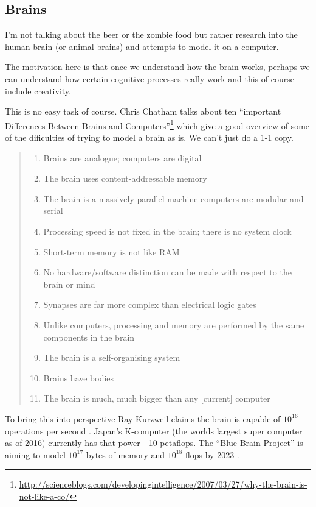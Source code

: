 \subsection{Brains}

I'm not talking about the beer or the zombie food but rather research into the human brain (or animal brains) and attempts to model it on a computer. 

The motivation here is that once we understand how the brain works, perhaps we can understand how certain cognitive processes really work and this of course include creativity.

This is no easy task of course. Chris Chatham talks about ten ``important Differences Between Brains and Computers''\footnote{\url{http://scienceblogs.com/developingintelligence/2007/03/27/why-the-brain-is-not-like-a-co/}} which give a good overview of some of the dificulties of trying to model a brain as is. We can't just do a 1-1 copy.

\begin{quotation}
  \begin{enumerate}
    \item Brains are analogue; computers are digital
    \item The brain uses content-addressable memory
    \item The brain is a massively parallel machine computers are modular and serial
    \item Processing speed is not fixed in the brain; there is no system clock
    \item Short-term memory is not like RAM
    \item No hardware/software distinction can be made with respect to the brain or mind
    \item Synapses are far more complex than electrical logic gates
    \item Unlike computers, processing and memory are performed by the same components in the brain
    \item The brain is a self-organising system
    \item Brains have bodies
    \item	The brain is much, much bigger than any [current] computer
  \end{enumerate}
\end{quotation}

To bring this into perspective Ray Kurzweil claims the brain is capable of $10^{16}$ operations per second \citeyear[p.194]{Kurzweil2013}. Japan's K-computer (the worlds largest super computer as of 2016) currently has that power---10 petaflops. The ``Blue Brain Project'' is aiming to model $10^17$ bytes of memory and $10^{18}$ flops by 2023 \autocite[p.125]{Kurzweil2013}.

